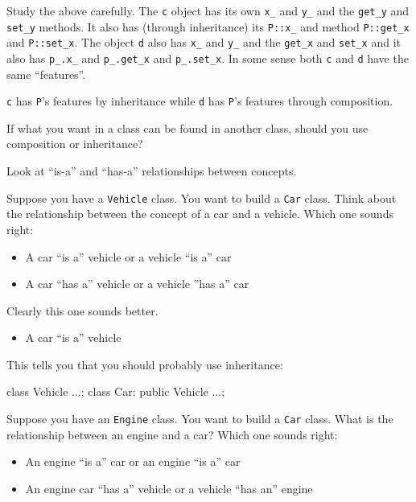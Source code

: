 
Study the above carefully. The \verb!c! object has its own \verb!x_!
and \verb!y_! and the \verb!get_y! and \verb!set_y! methods. It also
has (through inheritance) its \verb!P::x_! and method \verb!P::get_x!
and \verb!P::set_x!. The object \verb!d! also has \verb!x_! and
\verb!y_! and the \verb!get_x! and \verb!set_x! and it also has
\verb!p_.x_! and \verb!p_.get_x! and \verb!p_.set_x!. In some
sense both \verb!c! and \verb!d! have the same ``features''.

\verb!c! has \verb!P!'s features by inheritance while \verb!d! has
\verb!P!'s features through composition.

If what you want in a class can be found in another class, should you
use composition or inheritance?

Look at ``is-a'' and ``has-a'' relationships between concepts.

Suppose you have a \verb!Vehicle! class. You want to build a \verb!Car!
class. Think about the relationship between the concept of a car and a
vehicle. Which one sounds right:

\begin{itemize}
\item
  A car ``is a'' vehicle or a vehicle ``is a'' car
\item
  A car ``has a'' vehicle or a vehicle ''has a'' car
\end{itemize}

Clearly this one sounds better.

\begin{itemize}
\item
  A car ``is a'' vehicle
\end{itemize}

This tells you that you should probably use inheritance:
\begin{console}
class Vehicle {...};
class Car: public Vehicle {...};
\end{console}

Suppose you have an \verb!Engine! class. You want to build a \verb!Car!
class. What is the relationship between an engine and a car? Which one
sounds right:

\begin{itemize}
\item
  An engine ``is a'' car or an engine ``is a'' car
\item
  An engine car ``has a'' vehicle or a vehicle ``has an'' engine
\end{itemize}

